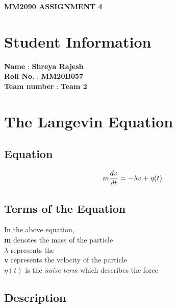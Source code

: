 \documentclass[a4paper, 12pt]{article}
\begin{document}
\begin{center}
	{\LARGE {\textbf {MM2090 ASSIGNMENT 4}}}
\end{center}

\section{Student Information}
\textbf {Name} : { \textbf {Shreya Rajesh}}\\
\textbf {Roll No.} : \textbf{{MM20B057}}\\
\textbf {Team number} : \textbf{{Team 2}}
\section{The Langevin Equation}
\subsection{Equation}
\begin{equation}
	{\LARGE{{m \frac{dv}{dt} = -\lambda v + \eta(t)}}}
	\label{eq:1}
\end{equation}
\subsection{Terms of the Equation}

{\normalsize{In the above equation,}}\\
{\normalsize {\textbf{m} denotes the mass of the particle }}\\
{\normalsize {\textbf{$ \lambda $ } represents the  }}\\
{\normalsize {\textbf{v} represents the velocity of the particle }}\\
{\normalsize {\textbf{$  \eta (t)$} is the \textit{noise term} which describes the force}}\\

\subsection{Description}
\end{document}
